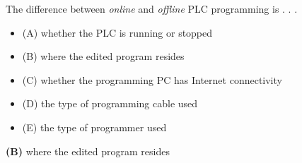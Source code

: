 

The difference between {\it online} and {\it offline} PLC programming is . . .

\begin{itemize}
\item{(A)} whether the PLC is running or stopped
\vskip 5pt 
\item{(B)} where the edited program resides
\vskip 5pt 
\item{(C)} whether the programming PC has Internet connectivity
\vskip 5pt 
\item{(D)} the type of programming cable used
\vskip 5pt 
\item{(E)} the type of programmer used
\end{itemize}







{\bf (B)} where the edited program resides
 










